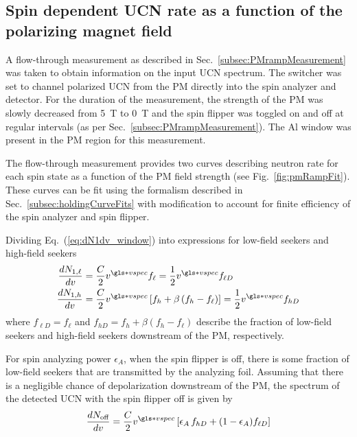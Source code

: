
\subsection{\label{subsec:PMramp}Spin dependent UCN rate as a function of the polarizing magnet field}


A flow-through measurement as described in Sec.~\ref{subsec:PMrampMeasurement} was taken to obtain information on the input UCN spectrum. The switcher was set to channel polarized UCN from the PM directly into the spin analyzer and detector. For the duration of the measurement, the strength of the PM was slowly decreased from 5~T to 0~T and the spin flipper was toggled on and off at regular intervals (as per Sec.~\ref{subsec:PMrampMeasurement}). The Al window was present in the PM region for this measurement.

The flow-through measurement provides two curves describing neutron rate for each spin state as a function of the PM field strength (see Fig.~\ref{fig:pmRampFit}). These curves can be fit using the formalism described in Sec.~\ref{subsec:holdingCurveFits} with modification to account for finite efficiency of the spin analyzer and spin flipper.

Dividing Eq.~(\ref{eq:dN1dv_window}) into expressions for low-field seekers and high-field seekers
%
\begin{align}
\frac{dN_{1,\ell}}{dv} &= \frac{C}{2}v^{\gls*{vspec}} f_\ell = \frac{1}{2}v^{\gls*{vspec}} f_{\ell D}\\
\frac{dN_{1,h}}{dv} &= \frac{C}{2}v^{\gls*{vspec}} \left[ f_h + \beta \left( f_h - f_\ell \right)  \right] = \frac{1}{2}v^{\gls*{vspec}} f_{h D}
\end{align}
%
where $f_{\ell D} = f_\ell$ and $f_{h D} = f_h +  \beta \left( f_h - f_\ell \right)$  describe the fraction of low-field seekers and high-field seekers downstream of the  PM, respectively.

For spin analyzing power $\epsilon_A$, when the spin flipper is off, there is some fraction of low-field seekers that are transmitted by the analyzing foil. Assuming that there is a negligible chance of depolarization downstream of the PM, the spectrum of the detected UCN with the spin flipper off is given by
%
\begin{gather}
    \frac{dN_\text{off}}{dv} = \frac{C}{2} v^{\gls*{vspec}} \left[ \epsilon_A\, f_{h D} + (1-\epsilon_A)f_{\ell D}  \right]
    \label{eq:dN_off/dv}
\end{gather}

